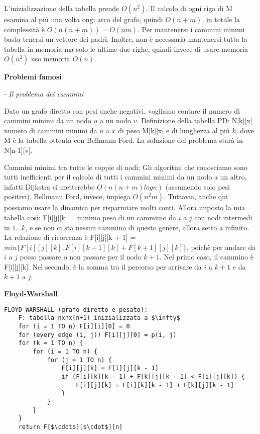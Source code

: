 \documentclass[a4paper,10pt]{article} %
\newcommand{\malgorithm}[1]{%
    {\bigbreak \par \hspace*{4pt} \underline{\textbf {#1}}}}
\renewcommand{\b}[1]{%
    {\textbf{#1}}}
\begin{document}
L'inizializzazione della tabella prende $O(n^2)$. Il calcolo di ogni riga di M esamina al più una volta ongi arco del grafo, quindi $O(n + m)$, in totale la complessità è $O(n(n + m)) = O(nm)$.  Per mantenersi i cammini minimi basta tenersi un vettore dei padri. Inoltre, non è necessaria mantenersi tutta la tabella in memoria ma solo le ultime due righe, quindi invece di usare memoria $O(n^2)$ uso memoria $O(n)$. 

\centerline{\b{Problemi famosi}}

- \emph{ Il problema dei cammini }

Dato un grafo diretto con pesi anche negativi, vogliamo contare il numero di cammini minimi da un nodo $u$ a un nodo $v$. Definizione della tabella PD: N[k][x] numero di cammini minimi da $u$ a $x$ di peso M[k][x] e di lunghezza al più $k$, dove M è la tabella otteuta con Bellmann-Ford. La soluzione del problema starà in N[n-1][v].

\bigskip

Cammini minimi tra tutte le coppie di nodi:
Gli algoritmi che conosciamo sono tutti inefficienti per il calcolo di tutti i cammini minimi da un nodo a un altro, infatti Dijkstra ci metterebbe $O(n(n+m)logn)$ (assumendo solo pesi positivi). Bellmann Ford, invece, impiega $O(n^2m)$. Tuttavia, anche qui possiamo usare la dinamica per risparmiare molti conti. Allora imposto la mia tabella così: F[i][j][k] = minimo peso di un cammiino da $i$ a $j$ con nodi intermedi in $1 \ldots k$, e se non ci sta nessun cammino di questo genere, allora setto a infinito. La relazione di ricorrenza è F[i][j][k + 1] = $min\{F[i][j][k], F[i][k + 1][k] + F[k + 1][j][k]\}$, poichè per andare da $i$ a $j$ posso passare o non passare per il nodo $k + 1$. Nel primo caso, il cammino è F[i][j][k]. Nel secondo, è la somma tra il percorso per arrivare da $i$ a $k + 1$ e da $k + 1$ a $j$. 

\malgorithm{Floyd-Warshall}
\begin{lstlisting}
FLOYD_WARSHALL (grafo diretto e pesato):
    F: tabella nxnx(n+1) inizializzata a $\infty$
    for (i = 1 TO n) F[i][i][0] = 0
    for (every edge (i, j)) F[i][j][0] = p(i, j)
    for (k = 1 TO n) {
        for (i = 1 TO n) {
            for (j = 1 TO n) {
                F[i][j][k] = F[i][j][k - 1]
                if (F[i][k][k - 1] + F[k][j][k - 1] < F[i][j][k]) {
                    F[i][j][k] = F[i][k][k - 1] + F[k][j][k - 1] 
                }
            }
        }
    }
    return F[$\cdot$][$\cdot$][n]
\end{lstlisting}
\end{document}
